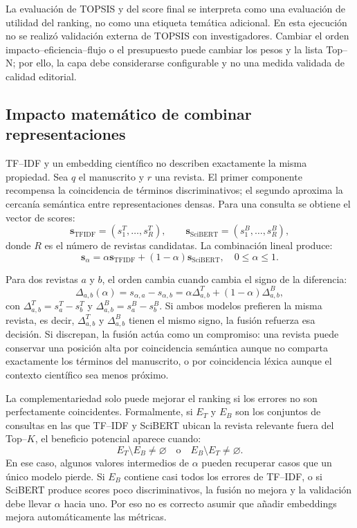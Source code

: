 \documentclass[12pt,a4paper]{article}
\begin{document}
La evaluación de TOPSIS y del score final se interpreta como una evaluación de utilidad del ranking, no como una etiqueta temática adicional. En esta ejecución no se realizó validación externa de TOPSIS con investigadores. Cambiar el orden impacto--eficiencia--flujo o el presupuesto puede cambiar los pesos y la lista Top--N; por ello, la capa debe considerarse configurable y no una medida validada de calidad editorial.

\subsection{Impacto matemático de combinar representaciones}
TF--IDF y un embedding científico no describen exactamente la misma propiedad. Sea $q$ el manuscrito y $r$ una revista. El primer componente recompensa la coincidencia de términos discriminativos; el segundo aproxima la cercanía semántica entre representaciones densas. Para una consulta se obtiene el vector de scores:
\begin{equation}
\mathbf{s}_{\mathrm{TFIDF}}=(s_1^{T},\ldots,s_R^{T}),\qquad
\mathbf{s}_{\mathrm{SciBERT}}=(s_1^{B},\ldots,s_R^{B}),
\end{equation}
\noindent donde $R$ es el número de revistas candidatas. La combinación lineal produce:
\begin{equation}
\mathbf{s}_{\alpha}=\alpha\mathbf{s}_{\mathrm{TFIDF}}+(1-\alpha)\mathbf{s}_{\mathrm{SciBERT}},\quad 0\leq\alpha\leq1.
\end{equation}

Para dos revistas $a$ y $b$, el orden cambia cuando cambia el signo de la diferencia:
\begin{equation}
\Delta_{a,b}(\alpha)=s_{\alpha,a}-s_{\alpha,b}
=\alpha\Delta^{T}_{a,b}+(1-\alpha)\Delta^{B}_{a,b},
\end{equation}
\noindent con $\Delta^{T}_{a,b}=s^T_a-s^T_b$ y $\Delta^{B}_{a,b}=s^B_a-s^B_b$. Si ambos modelos prefieren la misma revista, es decir, $\Delta^T_{a,b}$ y $\Delta^B_{a,b}$ tienen el mismo signo, la fusión refuerza esa decisión. Si discrepan, la fusión actúa como un compromiso: una revista puede conservar una posición alta por coincidencia semántica aunque no comparta exactamente los términos del manuscrito, o por coincidencia léxica aunque el contexto científico sea menos próximo.

La complementariedad solo puede mejorar el ranking si los errores no son perfectamente coincidentes. Formalmente, si $E_T$ y $E_B$ son los conjuntos de consultas en las que TF--IDF y SciBERT ubican la revista relevante fuera del Top--$K$, el beneficio potencial aparece cuando:
\begin{equation}
E_T\setminus E_B\neq\varnothing\quad\text{o}\quad
E_B\setminus E_T\neq\varnothing.
\end{equation}
En ese caso, algunos valores intermedios de $\alpha$ pueden recuperar casos que un único modelo pierde. Si $E_B$ contiene casi todos los errores de TF--IDF, o si SciBERT produce scores poco discriminativos, la fusión no mejora y la validación debe llevar $\alpha$ hacia uno. Por eso no es correcto asumir que añadir embeddings mejora automáticamente las métricas.
\end{document}
